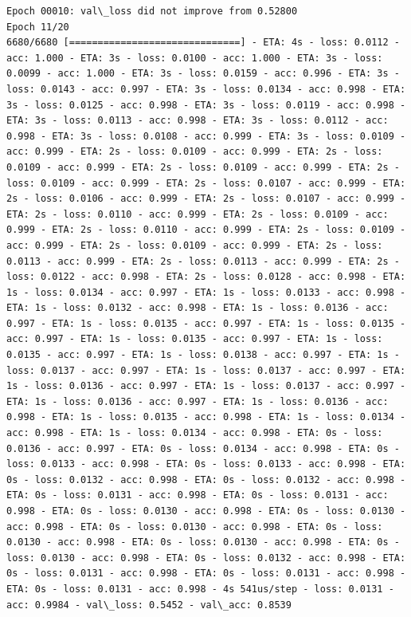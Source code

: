 \documentclass[11pt]{article}
\begin{document}
\begin{Verbatim}[commandchars=\\\{\}]
Epoch 00010: val\_loss did not improve from 0.52800
Epoch 11/20
6680/6680 [==============================] - ETA: 4s - loss: 0.0112 - acc: 1.000 - ETA: 3s - loss: 0.0100 - acc: 1.000 - ETA: 3s - loss: 0.0099 - acc: 1.000 - ETA: 3s - loss: 0.0159 - acc: 0.996 - ETA: 3s - loss: 0.0143 - acc: 0.997 - ETA: 3s - loss: 0.0134 - acc: 0.998 - ETA: 3s - loss: 0.0125 - acc: 0.998 - ETA: 3s - loss: 0.0119 - acc: 0.998 - ETA: 3s - loss: 0.0113 - acc: 0.998 - ETA: 3s - loss: 0.0112 - acc: 0.998 - ETA: 3s - loss: 0.0108 - acc: 0.999 - ETA: 3s - loss: 0.0109 - acc: 0.999 - ETA: 2s - loss: 0.0109 - acc: 0.999 - ETA: 2s - loss: 0.0109 - acc: 0.999 - ETA: 2s - loss: 0.0109 - acc: 0.999 - ETA: 2s - loss: 0.0109 - acc: 0.999 - ETA: 2s - loss: 0.0107 - acc: 0.999 - ETA: 2s - loss: 0.0106 - acc: 0.999 - ETA: 2s - loss: 0.0107 - acc: 0.999 - ETA: 2s - loss: 0.0110 - acc: 0.999 - ETA: 2s - loss: 0.0109 - acc: 0.999 - ETA: 2s - loss: 0.0110 - acc: 0.999 - ETA: 2s - loss: 0.0109 - acc: 0.999 - ETA: 2s - loss: 0.0109 - acc: 0.999 - ETA: 2s - loss: 0.0113 - acc: 0.999 - ETA: 2s - loss: 0.0113 - acc: 0.999 - ETA: 2s - loss: 0.0122 - acc: 0.998 - ETA: 2s - loss: 0.0128 - acc: 0.998 - ETA: 1s - loss: 0.0134 - acc: 0.997 - ETA: 1s - loss: 0.0133 - acc: 0.998 - ETA: 1s - loss: 0.0132 - acc: 0.998 - ETA: 1s - loss: 0.0136 - acc: 0.997 - ETA: 1s - loss: 0.0135 - acc: 0.997 - ETA: 1s - loss: 0.0135 - acc: 0.997 - ETA: 1s - loss: 0.0135 - acc: 0.997 - ETA: 1s - loss: 0.0135 - acc: 0.997 - ETA: 1s - loss: 0.0138 - acc: 0.997 - ETA: 1s - loss: 0.0137 - acc: 0.997 - ETA: 1s - loss: 0.0137 - acc: 0.997 - ETA: 1s - loss: 0.0136 - acc: 0.997 - ETA: 1s - loss: 0.0137 - acc: 0.997 - ETA: 1s - loss: 0.0136 - acc: 0.997 - ETA: 1s - loss: 0.0136 - acc: 0.998 - ETA: 1s - loss: 0.0135 - acc: 0.998 - ETA: 1s - loss: 0.0134 - acc: 0.998 - ETA: 1s - loss: 0.0134 - acc: 0.998 - ETA: 0s - loss: 0.0136 - acc: 0.997 - ETA: 0s - loss: 0.0134 - acc: 0.998 - ETA: 0s - loss: 0.0133 - acc: 0.998 - ETA: 0s - loss: 0.0133 - acc: 0.998 - ETA: 0s - loss: 0.0132 - acc: 0.998 - ETA: 0s - loss: 0.0132 - acc: 0.998 - ETA: 0s - loss: 0.0131 - acc: 0.998 - ETA: 0s - loss: 0.0131 - acc: 0.998 - ETA: 0s - loss: 0.0130 - acc: 0.998 - ETA: 0s - loss: 0.0130 - acc: 0.998 - ETA: 0s - loss: 0.0130 - acc: 0.998 - ETA: 0s - loss: 0.0130 - acc: 0.998 - ETA: 0s - loss: 0.0130 - acc: 0.998 - ETA: 0s - loss: 0.0130 - acc: 0.998 - ETA: 0s - loss: 0.0132 - acc: 0.998 - ETA: 0s - loss: 0.0131 - acc: 0.998 - ETA: 0s - loss: 0.0131 - acc: 0.998 - ETA: 0s - loss: 0.0131 - acc: 0.998 - 4s 541us/step - loss: 0.0131 - acc: 0.9984 - val\_loss: 0.5452 - val\_acc: 0.8539


\end{Verbatim}
\end{document}
